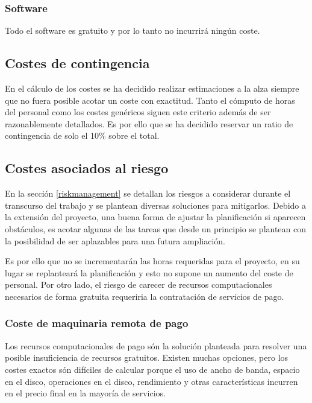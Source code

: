 \subsubsection{Software} Todo el software es gratuito y por lo tanto no incurrirá ningún coste.

\subsection{Costes de contingencia}
En el cálculo de los costes se ha decidido realizar estimaciones a la alza siempre que no fuera posible acotar
un coste con exactitud. Tanto el cómputo de horas del personal como los costes genéricos siguen este
criterio además de ser razonablemente detallados.
Es por ello que se ha decidido reservar un ratio de contingencia de solo el 10\% sobre el total.

\subsection{Costes asociados al riesgo}
En la sección \ref{riskmanagement} se detallan los riesgos a considerar durante el transcurso del trabajo y se plantean
diversas soluciones para mitigarlos. Debido a la extensión del proyecto, una buena forma de ajustar la planificación
si aparecen obstáculos, es acotar algunas de las tareas que desde un principio se plantean con la posibilidad de 
ser aplazables para una futura ampliación.

Es por ello que no se incrementarán las horas requeridas para el proyecto, en su lugar se
replanteará la planificación y esto no supone un aumento del coste de personal.
Por otro lado, el riesgo de carecer de recursos computacionales necesarios de forma gratuita requeriria la contratación
de servicios de pago.

\subsubsection{Coste de maquinaria remota de pago}\label{maquinariardepago}
Los recursos computacionales de pago són la solución planteada para resolver una posible insuficiencia de recursos
gratuitos.
Existen muchas opciones, pero los costes exactos són difíciles de calcular porque el uso de ancho de banda,
espacio en el disco, operaciones en el disco, rendimiento y otras características incurren en el precio final en la mayoría
de servicios.

